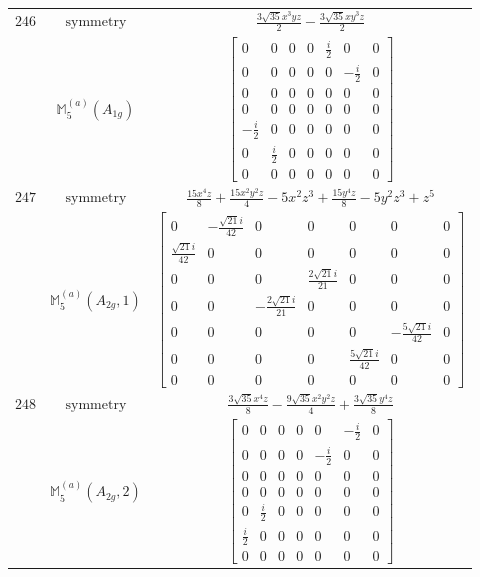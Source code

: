\documentclass[fleqn,8pt,landscape]{jsarticle}
\begin{document}
\begin{longtable}{ccc}
$ 246 $ & $ \text{symmetry} $ & $ \frac{3 \sqrt{35} x^{3} y z}{2} - \frac{3 \sqrt{35} x y^{3} z}{2} $ \\
$  $ & $ \mathbb{M}_{5}^{(a)}(A_{1g}) $ & $ \begin{bmatrix} 0 & 0 & 0 & 0 & \frac{i}{2} & 0 & 0 \\ 0 & 0 & 0 & 0 & 0 & - \frac{i}{2} & 0 \\ 0 & 0 & 0 & 0 & 0 & 0 & 0 \\ 0 & 0 & 0 & 0 & 0 & 0 & 0 \\ - \frac{i}{2} & 0 & 0 & 0 & 0 & 0 & 0 \\ 0 & \frac{i}{2} & 0 & 0 & 0 & 0 & 0 \\ 0 & 0 & 0 & 0 & 0 & 0 & 0 \end{bmatrix} $ \\ \hline
$ 247 $ & $ \text{symmetry} $ & $ \frac{15 x^{4} z}{8} + \frac{15 x^{2} y^{2} z}{4} - 5 x^{2} z^{3} + \frac{15 y^{4} z}{8} - 5 y^{2} z^{3} + z^{5} $ \\
$  $ & $ \mathbb{M}_{5}^{(a)}(A_{2g},1) $ & $ \begin{bmatrix} 0 & - \frac{\sqrt{21} i}{42} & 0 & 0 & 0 & 0 & 0 \\ \frac{\sqrt{21} i}{42} & 0 & 0 & 0 & 0 & 0 & 0 \\ 0 & 0 & 0 & \frac{2 \sqrt{21} i}{21} & 0 & 0 & 0 \\ 0 & 0 & - \frac{2 \sqrt{21} i}{21} & 0 & 0 & 0 & 0 \\ 0 & 0 & 0 & 0 & 0 & - \frac{5 \sqrt{21} i}{42} & 0 \\ 0 & 0 & 0 & 0 & \frac{5 \sqrt{21} i}{42} & 0 & 0 \\ 0 & 0 & 0 & 0 & 0 & 0 & 0 \end{bmatrix} $ \\ \hline
$ 248 $ & $ \text{symmetry} $ & $ \frac{3 \sqrt{35} x^{4} z}{8} - \frac{9 \sqrt{35} x^{2} y^{2} z}{4} + \frac{3 \sqrt{35} y^{4} z}{8} $ \\
$  $ & $ \mathbb{M}_{5}^{(a)}(A_{2g},2) $ & $ \begin{bmatrix} 0 & 0 & 0 & 0 & 0 & - \frac{i}{2} & 0 \\ 0 & 0 & 0 & 0 & - \frac{i}{2} & 0 & 0 \\ 0 & 0 & 0 & 0 & 0 & 0 & 0 \\ 0 & 0 & 0 & 0 & 0 & 0 & 0 \\ 0 & \frac{i}{2} & 0 & 0 & 0 & 0 & 0 \\ \frac{i}{2} & 0 & 0 & 0 & 0 & 0 & 0 \\ 0 & 0 & 0 & 0 & 0 & 0 & 0 \end{bmatrix} $ \\ \hline

\end{longtable}
\end{document}
